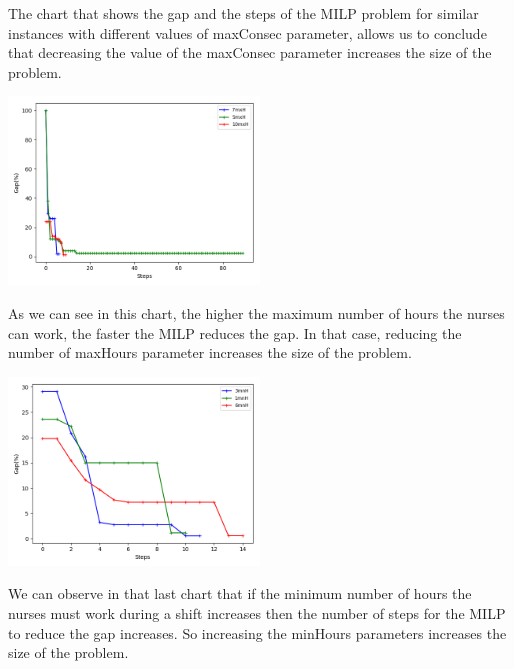 The chart that shows the gap and the steps of the MILP problem for similar instances with different values of maxConsec parameter, allows us to conclude that decreasing the value of the maxConsec parameter increases the size of the problem.

\begin{center}
\includegraphics[width=0.5\textwidth]{./img/instances_maxhours_ilp_evol.png}
\end{center} 

As we can see in this chart, the higher the maximum number of hours the nurses can work, the faster the MILP reduces the gap. In that case, reducing the number of maxHours parameter increases the size of the problem. 

\begin{center}
\includegraphics[width=0.5\textwidth]{./img/instances_minhours_ilp_evol.png}
\end{center}

We can observe in that last chart that if the minimum number of hours the nurses must work during a shift increases then the number of steps for the MILP to reduce the gap increases. So increasing the minHours parameters increases the size of the problem.


